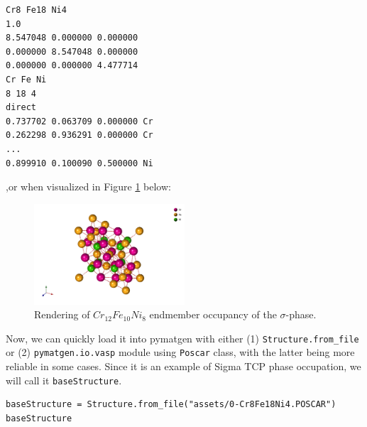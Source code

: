 \begin{verbatim}
Cr8 Fe18 Ni4
1.0
8.547048 0.000000 0.000000
0.000000 8.547048 0.000000
0.000000 0.000000 4.477714
Cr Fe Ni
8 18 4
direct
0.737702 0.063709 0.000000 Cr
0.262298 0.936291 0.000000 Cr
...
0.899910 0.100090 0.500000 Ni
\end{verbatim}

,or when visualized in Figure \ref{pysipfenntutorial:simgaexample} below:

\begin{figure}[H]
    \centering
    \includegraphics[width=0.5\textwidth]{pysipfennTutorial1/112-Cr12Fe10Ni8.png}
    \caption{Rendering of $Cr_{12}Fe_{10}Ni_8$ endmember occupancy of the $\sigma$-phase.}
    \label{pysipfenntutorial:simgaexample}
\end{figure}

Now, we can quickly load it into pymatgen with either (1)
\texttt{Structure.from\_file} or (2)
\texttt{pymatgen.io.vasp} module using
\texttt{Poscar} class, with the latter being more
reliable in some cases. Since it is an example of Sigma TCP phase
occupation, we will call it \texttt{baseStructure}.

\begin{verbatim}
baseStructure = Structure.from_file("assets/0-Cr8Fe18Ni4.POSCAR")
baseStructure
\end{verbatim}

